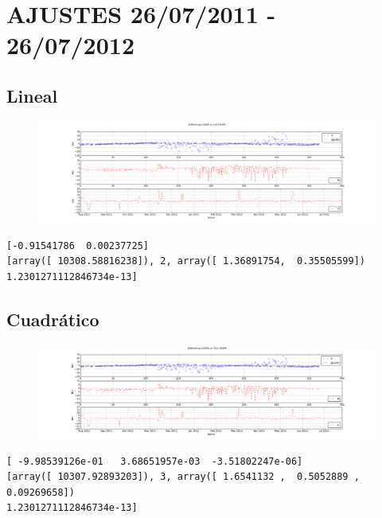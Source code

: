 \section{AJUSTES 26/07/2011 - 26/07/2012}
\subsection{Lineal}
\begin{figure}[!h]
\centering
  \includegraphics[width=\textwidth]{imagenes/sacDajusteG1}
\end{figure}
\begin{verbatim}
[-0.91541786  0.00237725]
[array([ 10308.58816238]), 2, array([ 1.36891754,  0.35505599])
1.2301271112846734e-13]
\end{verbatim}

\subsection{Cuadr\'atico}
\begin{figure}[!h]
\centering
  \includegraphics[width=\textwidth]{imagenes/sacDajusteG2}
\end{figure}
\begin{verbatim}
[ -9.98539126e-01   3.68651957e-03  -3.51802247e-06]
[array([ 10307.92893203]), 3, array([ 1.6541132 ,  0.5052889 ,  0.09269658])
1.2301271112846734e-13]
\end{verbatim}

